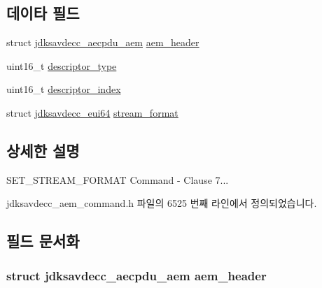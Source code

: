 \subsection*{데이타 필드}
\begin{DoxyCompactItemize}
\item 
struct \hyperlink{structjdksavdecc__aecpdu__aem}{jdksavdecc\+\_\+aecpdu\+\_\+aem} \hyperlink{structjdksavdecc__aem__command__set__stream__format_ae1e77ccb75ff5021ad923221eab38294}{aem\+\_\+header}
\item 
uint16\+\_\+t \hyperlink{structjdksavdecc__aem__command__set__stream__format_ab7c32b6c7131c13d4ea3b7ee2f09b78d}{descriptor\+\_\+type}
\item 
uint16\+\_\+t \hyperlink{structjdksavdecc__aem__command__set__stream__format_a042bbc76d835b82d27c1932431ee38d4}{descriptor\+\_\+index}
\item 
struct \hyperlink{structjdksavdecc__eui64}{jdksavdecc\+\_\+eui64} \hyperlink{structjdksavdecc__aem__command__set__stream__format_a77359be54ea386b1da66597746709ed0}{stream\+\_\+format}
\end{DoxyCompactItemize}


\subsection{상세한 설명}
S\+E\+T\+\_\+\+S\+T\+R\+E\+A\+M\+\_\+\+F\+O\+R\+M\+AT Command -\/ Clause 7... 

jdksavdecc\+\_\+aem\+\_\+command.\+h 파일의 6525 번째 라인에서 정의되었습니다.



\subsection{필드 문서화}
\subsubsection[{\texorpdfstring{aem\+\_\+header}{aem_header}}]{\setlength{\rightskip}{0pt plus 5cm}struct {\bf jdksavdecc\+\_\+aecpdu\+\_\+aem} aem\+\_\+header}\hypertarget{structjdksavdecc__aem__command__set__stream__format_ae1e77ccb75ff5021ad923221eab38294}{}\label{structjdksavdecc__aem__command__set__stream__format_ae1e77ccb75ff5021ad923221eab38294}


